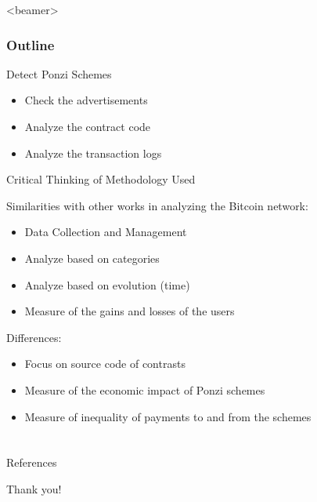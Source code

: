\documentclass[aspectratio=169,10pt]{beamer}
\begin{document}
\begin{frame}<beamer>
    \frametitle{Outline}
    \tableofcontents[sectionstyle=show/shaded,subsectionstyle=show/shaded/shaded]
\end{frame}

\begin{frame}{Detect Ponzi Schemes}
\begin{itemize}
\item Check the advertisements
\item Analyze the contract code
\item Analyze the transaction logs
\end{itemize}
\end{frame}

\begin{frame}{Critical Thinking of Methodology Used}

Similarities with other works in analyzing the Bitcoin network:
\begin{itemize}
\item Data Collection and Management
\item Analyze based on categories
\item Analyze based on evolution (time)
\item Measure of the gains and losses of the users
\end{itemize}\bigskip

\pause

Differences:

\begin{itemize}
\item Focus on source code of contrasts
\item Measure of the economic impact of Ponzi schemes
\item Measure of inequality of payments to and from the schemes
\end{itemize}

\end{frame}

\section*{}

\begin{frame}{References}


\end{frame}

\begin{frame}
\begin{center}
\Huge
Thank you!
\end{center}
\end{frame}
\end{document}
